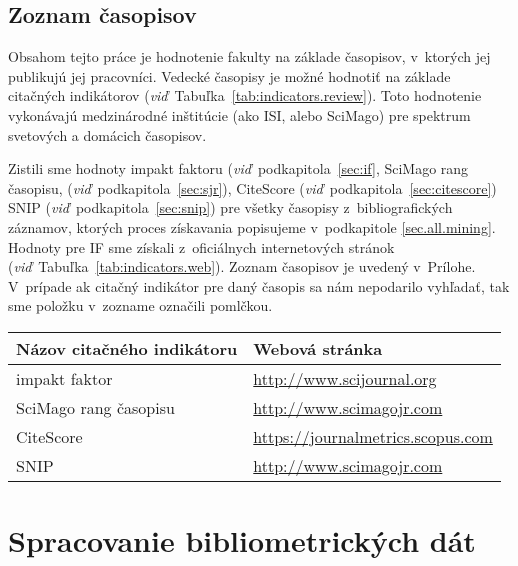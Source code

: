 \subsection{Zoznam časopisov}
\label{sec:journal.mining}

Obsahom tejto práce je hodnotenie fakulty na základe časopisov, v~ktorých jej
publikujú jej pracovníci.  Vedecké časopisy je možné hodnotiť na základe
citačných indikátorov (\emph{viď}~Tabuľka~\ref{tab:indicators.review}).  Toto
hodnotenie vykonávajú medzinárodné inštitúcie (ako ISI, alebo SciMago) pre
spektrum svetových a domácich časopisov.

Zistili sme hodnoty impakt faktoru (\emph{viď}~podkapitola~\ref{sec:if}, SciMago
rang časopisu, (\emph{viď}~podkapitola~\ref{sec:sjr}), CiteScore
(\emph{viď}~podkapitola~\ref{sec:citescore}) SNIP
(\emph{viď}~podkapitola~\ref{sec:snip}) pre všetky časopisy z~bibliografických
záznamov, ktorých proces získavania popisujeme v~podkapitole
\ref{sec.all.mining}.  Hodnoty pre IF sme získali z~oficiálnych internetových
stránok (\emph{viď}~Tabuľka~\ref{tab:indicators.web}).  Zoznam časopisov je
uvedený v~Prílohe.  V~prípade ak citačný indikátor pre daný časopis sa nám
nepodarilo vyhľadať, tak sme položku v~zozname označili pomlčkou.

\begin{SCtable}
  \centering\small
  \caption[Webové stránky citačných indikátorov na hodnotenie časopisov]%
  {Zoznam citačných indikátorov na hodnotenie časopisov, s~odkazmi na oficiálne
    webové stránky.}
  \label{tab:indicators.web}
  \begin{tabular}{ll}
    \toprule
    Názov citačného indikátoru      & Webová stránka\\
    \midrule
    impakt faktor         & {\footnotesize \url{http://www.scijournal.org}}         \\
    SciMago rang časopisu & {\footnotesize \url{http://www.scimagojr.com}}          \\
    CiteScore             & {\footnotesize \url{https://journalmetrics.scopus.com}} \\
    SNIP                  & {\footnotesize \url{http://www.scimagojr.com}}          \\
    \bottomrule
  \end{tabular}
\end{SCtable}

\section{Spracovanie bibliometrických dát}


